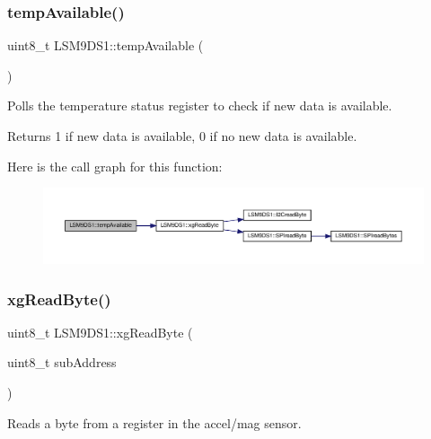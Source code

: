\subsubsection{\texorpdfstring{temp\+Available()}{tempAvailable()}}
{\footnotesize\ttfamily uint8\+\_\+t L\+S\+M9\+D\+S1\+::temp\+Available (\begin{DoxyParamCaption}{ }\end{DoxyParamCaption})}



Polls the temperature status register to check if new data is available. 

\begin{DoxyReturn}{Returns}
1 if new data is available, 0 if no new data is available. 
\end{DoxyReturn}
Here is the call graph for this function\+:\nopagebreak
\begin{figure}[H]
\begin{center}
\leavevmode
\includegraphics[width=350pt]{classLSM9DS1_aaf6683c6f3f0281d5222b74f580f321b_cgraph}
\end{center}
\end{figure}
\mbox{\label{classLSM9DS1_af7f9789df6f0178764c815a3380c202a}} 
\subsubsection{\texorpdfstring{xg\+Read\+Byte()}{xgReadByte()}}
{\footnotesize\ttfamily uint8\+\_\+t L\+S\+M9\+D\+S1\+::xg\+Read\+Byte (\begin{DoxyParamCaption}\item[{uint8\+\_\+t}]{sub\+Address }\end{DoxyParamCaption})\hspace{0.3cm}{\ttfamily [protected]}}



Reads a byte from a register in the accel/mag sensor. 


